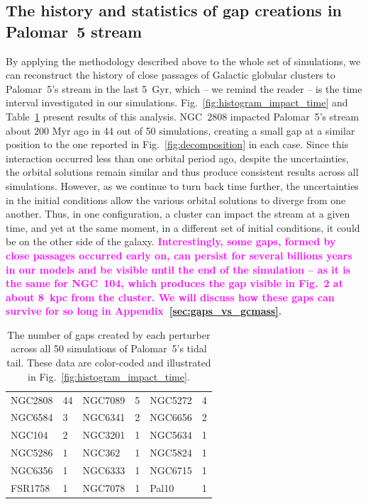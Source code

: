 \documentclass{aa}
\newcommand{\paola}[1]{\textcolor{magenta}{{#1}}}
\begin{document}
  \subsection{The history and statistics of gap creations in Palomar~5 stream}\label{sect:history}
  

      


    By applying the methodology described above to the whole set of simulations, we can reconstruct the history of close passages of Galactic globular clusters to Palomar~5's stream in the last 5~Gyr, which -- we remind the reader -- is the time interval investigated in our simulations.  Fig.~\ref{fig:histogram_impact_time} and Table~\ref{tab:gaps_per_perturber} present results of this analysis. NGC~2808 impacted Palomar~5's stream about 200 Myr ago in 44 out of 50 simulations, creating a small gap at a similar position to the one reported in Fig.~\ref{fig:decomposition} in each case. Since this interaction occurred less than one orbital period ago, despite the uncertainties, the orbital solutions remain similar and thus produce consistent results across all simulations. However, as we continue to turn back time further, the uncertainties in the initial conditions allow the various orbital solutions to diverge from one another. Thus, in one configuration, a cluster can impact the stream at a given time, and yet at the same moment, in a different set of initial conditions, it could be on the other side of the galaxy. \textbf{\paola{Interestingly, some gaps, formed by close passages occurred early on, can persist for several billions years in our models and be visible until the end of the simulation -- as it is the same for NGC~104, which produces the gap visible in Fig.~2 at about 8~kpc from the cluster. We will discuss how these gaps can survive for so long in Appendix~\ref{sec:gaps_vs_gcmass}. }}
    

    \begin{table}[h]
      \centering
      \begin{tabular}{|ll|ll|ll|}
      \hline
      NGC2808 & 44 & NGC7089 & 5 & NGC5272 & 4 \\
      NGC6584 & 3 & NGC6341 & 2 & NGC6656 & 2 \\
      NGC104 & 2 & NGC3201 & 1 & NGC5634 & 1 \\
      NGC5286 & 1 & NGC362 & 1 & NGC5824 & 1 \\
      NGC6356 & 1 & NGC6333 & 1 & NGC6715 & 1 \\
      FSR1758 & 1 & NGC7078 & 1 & Pal10 & 1 \\
      \hline
      \end{tabular}
      \caption{The number of gaps created by each perturber across all 50 simulations of Palomar~5's tidal tail. These data are color-coded and illustrated in Fig.~\ref{fig:histogram_impact_time}.}
      \label{tab:gaps_per_perturber}
    \end{table} 
    
\end{document}

